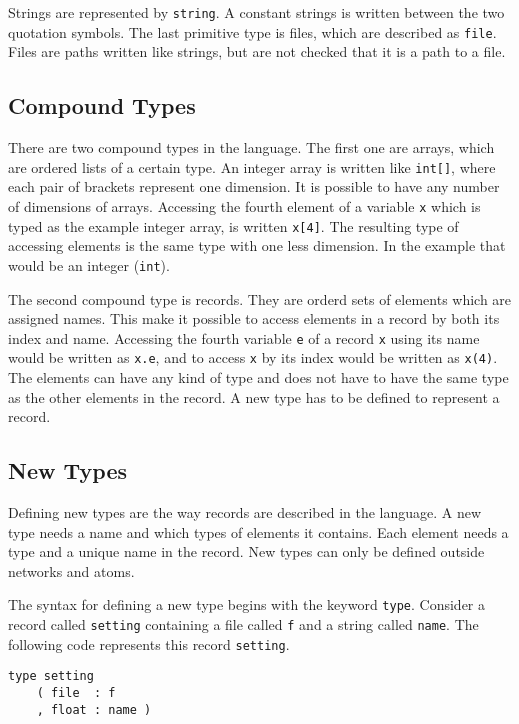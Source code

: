 Strings are represented by \verb#string#. A constant strings is
written between the two quotation symbols. The last primitive type is
files, which are described as \verb#file#. Files are paths written
like strings, but are not checked that it is a path to a file.

\subsection{Compound Types}\label{sec:compound}
There are two compound types in the language. The first one are
arrays, which are ordered lists of a certain type. An integer array is
written like \verb#int[]#, where each pair of brackets represent one
dimension. It is possible to have any number of dimensions of
arrays. Accessing the fourth element of a variable \verb#x# which is
typed as the example integer array, is written \verb#x[4]#. The
resulting type of accessing elements is the same type with one less
dimension. In the example that would be an integer (\verb#int#).

The second compound type is records. They are orderd sets of elements
which are assigned names. This make it possible to access elements in
a record by both its index and name. Accessing the fourth variable
\verb#e# of a record \verb#x# using its name would be written as
\verb#x.e#, and to access \verb#x# by its index would be written as
\verb#x(4)#. The elements can have any kind of type and does not have
to have the same type as the other elements in the record. A new type
has to be defined to represent a record.

\subsection{New Types}
Defining new types are the way records are described in the
language. A new type needs a name and which types of elements it
contains. Each element needs a type and a unique name in the
record. New types can only be defined outside networks and atoms.

The syntax for defining a new type begins with the keyword
\verb#type#. Consider a record called \verb#setting# containing a file
called \verb#f# and a string called \verb#name#. The following code
represents this record \verb#setting#.

\begin{verbatim}
type setting
    ( file  : f
    , float : name )
\end{verbatim}

